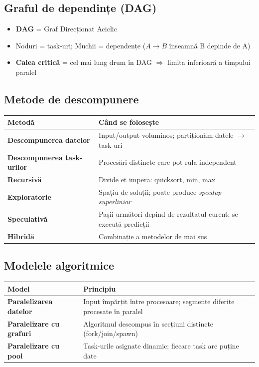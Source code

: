 \documentclass[a4paper,11pt]{article}
\newcommand{\thead}[1]{\cellcolor{tblheader}\color{white}\textbf{#1}}
\begin{document}
\subsection{Graful de dependințe (DAG)}

\begin{itemize}[noitemsep]
  \item \textbf{DAG} = Graf Direcționat Aciclic
  \item Noduri = task-uri; Muchii = dependențe ($A \to B$ înseamnă B depinde de A)
  \item \textbf{Calea critică} = cel mai lung drum în DAG $\Rightarrow$ limita inferioară a timpului paralel
\end{itemize}

\subsection{Metode de descompunere}

\begin{center}
\begin{tabularx}{\textwidth}{lX}
\toprule
\thead{Metodă} & \thead{Când se folosește} \\
\midrule
\textbf{Descompunerea datelor} & Input/output voluminos; partiționăm datele $\to$ task-uri \\
\textbf{Descompunerea task-urilor} & Procesări distincte care pot rula independent \\
\textbf{Recursivă} & Divide et impera: quicksort, min, max \\
\textbf{Exploratorie} & Spațiu de soluții; poate produce \emph{speedup superliniar} \\
\textbf{Speculativă} & Pașii următori depind de rezultatul curent; se execută predicții \\
\textbf{Hibridă} & Combinație a metodelor de mai sus \\
\bottomrule
\end{tabularx}
\end{center}

\subsection{Modelele algoritmice}

\begin{center}
\begin{tabularx}{\textwidth}{lX}
\toprule
\thead{Model} & \thead{Principiu} \\
\midrule
\textbf{Paralelizarea datelor} & Input împărțit între procesoare; segmente diferite procesate în paralel \\
\textbf{Paralelizare cu grafuri} & Algoritmul descompus în secțiuni distincte (fork/join/spawn) \\
\textbf{Paralelizare cu pool} & Task-urile asignate dinamic; fiecare task are puține date \\
\bottomrule
\end{tabularx}
\end{center}
\end{document}
